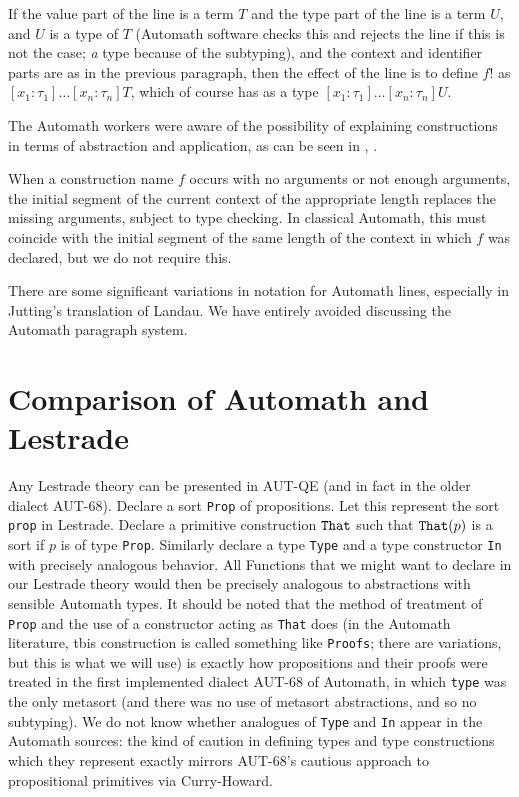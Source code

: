 \documentclass{article}
\begin{document}
If the value part of the line is a term $T$ and the type part of the line is a term $U$, and $U$ is a type of $T$ (Automath software checks this and rejects the line if this is not the case; {\em a\/} type because of the subtyping), and the context and identifier parts are as in the previous paragraph,  then the effect of the line is to define $f!$ as $[x_1:\tau_1]\ldots[x_n:\tau_n]T$, which of course has as a type $[x_1:\tau_1]\ldots[x_n:\tau_n]U$.

The Automath workers were aware of the possibility of explaining constructions in terms of abstraction and application, as can be seen in \cite{autsl}, \cite{autlambda}.

When a construction name $f$ occurs with no arguments or not enough arguments, the initial segment of the current context of the appropriate length replaces the missing arguments, subject to type checking.  In classical Automath, this must coincide with the initial segment of the same length of the context in which $f$ was declared, but we do not require this.

There are some significant variations in notation for Automath lines, especially in Jutting's translation of Landau.  We have entirely avoided discussing the Automath paragraph system.

\section{Comparison of Automath and Lestrade}

Any Lestrade theory can be presented in AUT-QE (and in fact in the older dialect AUT-68).  Declare a sort {\tt Prop} of propositions.  Let this represent the
sort {\tt prop} in Lestrade.  Declare a primitive construction ${\tt That}$ such that ${\tt That}(p)$ is a sort if $p$ is of type {\tt Prop}.
Similarly declare a type {\tt Type} and a type constructor {\tt In} with precisely analogous behavior.  All Functions that we might want to declare
in our Lestrade theory would then be precisely analogous to abstractions with sensible Automath types.  It should be noted that the method of treatment of {\tt Prop}
and the use of a constructor acting as {\tt That} does (in the Automath literature, tbis construction is called something like {\tt Proofs}; there are variations, but this is what we will use) is exactly how propositions
and their proofs were treated in the first implemented dialect AUT-68 of Automath, in which {\tt type} was the only metasort (and there was no use
of metasort abstractions, and so no subtyping).  We do not know whether analogues of {\tt Type} and {\tt In} appear in the Automath sources:  the kind of caution in defining types and type constructions which they represent exactly mirrors AUT-68's cautious approach to propositional primitives via Curry-Howard.
\end{document}
